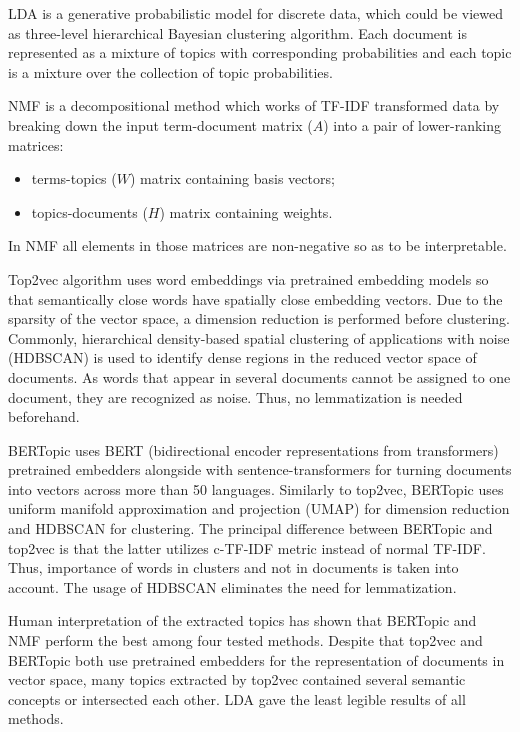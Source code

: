 \documentclass[13pt, a4paper]{article}
\begin{document}
LDA is a generative probabilistic model for discrete data, which could be viewed as three-level hierarchical Bayesian clustering algorithm. Each document is represented as a mixture of topics with corresponding probabilities and each topic is a mixture over the collection of topic probabilities.

NMF is a decompositional method which works of TF-IDF transformed data by breaking down the input term-document matrix ($A$) into a pair of lower-ranking matrices:
\begin{itemize}
	\item terms-topics ($W$) matrix containing basis vectors;
	\item topics-documents ($H$) matrix containing weights.
\end{itemize}
In NMF all elements in those matrices are non-negative so as to be interpretable.

Top2vec algorithm uses word embeddings via pretrained embedding models so that semantically close words have spatially close embedding vectors. Due to the sparsity of the vector space, a dimension reduction is performed before clustering. Commonly, hierarchical density-based spatial clustering of applications with noise (HDBSCAN) is used to identify dense regions in the reduced vector space of documents. As words that appear in several documents cannot be assigned to one document, they are recognized as noise. Thus, no lemmatization is needed beforehand.

BERTopic uses BERT (bidirectional encoder representations from transformers) pretrained embedders alongside with sentence-transformers for turning documents into vectors across more than 50 languages. Similarly to top2vec, BERTopic uses uniform manifold approximation and projection (UMAP) for dimension reduction and HDBSCAN for clustering. The principal difference between BERTopic and top2vec is that the latter utilizes c-TF-IDF metric instead of normal TF-IDF. Thus, importance of words in clusters and not in documents is taken into account. The usage of HDBSCAN eliminates the need for lemmatization.

Human interpretation of the extracted topics has shown that BERTopic and NMF perform the best among four tested methods. Despite that top2vec and BERTopic both use pretrained embedders for the representation of documents in vector space, many topics extracted by top2vec contained several semantic concepts or intersected each other. LDA gave the least legible results of all methods.
\end{document}
